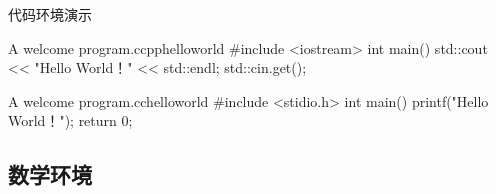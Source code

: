 \documentclass[hyperref,UTF8,11pt,CJK]{beamer}
\begin{document}
\begin{frame}[fragile]{代码环境演示}
	\onslide<2>
	\begin{scucode}[]{A welcome program.}{c}{}{cpphelloworld}
		#include <iostream>
		int main()
		{
			std::cout << "Hello World！" << std::endl;
			std::cin.get();
		}
	\end{scucode}
	\begin{scushow}[]{A welcome program.}{c}{}{chelloworld}
		#include <stidio.h>
		int main()
		{
			printf("Hello World！");
			return 0;
		}
	\end{scushow}
\end{frame}

\subsection{数学环境}
\end{document}
